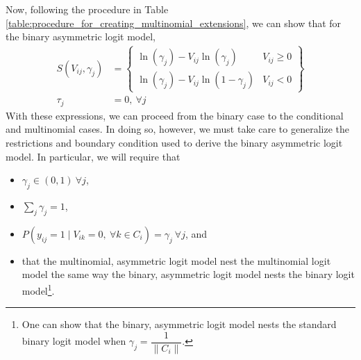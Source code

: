 Now, following the procedure in Table \ref{table:procedure_for_creating_multinomial_extensions}, we can show that for the binary asymmetric logit model,
\begin{equation*}
\begin{aligned}
S \left( V_{ij}, \gamma _j \right) &= \left\lbrace \begin{array}{cc}
 \ln \left( \gamma _j \right) - V_{ij} \ln \left( \gamma_j \right) & V_{ij} \geq 0
 \\
 \ln \left( \gamma _j \right) - V_{ij} \ln \left( 1 - \gamma_j \right) & V_{ij} < 0
\end{array} \right\rbrace \\
\tau_j &= 0, \ \forall j
\end{aligned}
\end{equation*}
With these expressions, we can proceed from the binary case to the conditional and multinomial cases. In doing so, however, we must take care to generalize the restrictions and boundary condition used to derive the binary asymmetric logit model. In particular, we will require that
\begin{itemize}
\item $\gamma_j \in \left( 0, 1 \right) \ \forall j$,
\item $ \sum _j \gamma_j = 1$,
\item $ P \left( y_{ij} = 1 \mid V_{ik} = 0, \  \forall k \in C_i \right) = \gamma _j \ \forall j $, and 
\item that the multinomial, asymmetric logit model nest the multinomial logit model the same way the binary, asymmetric logit model nests the binary logit model\footnote{One can show that the binary, asymmetric logit model nests the standard binary logit model when $\gamma _j = \dfrac{1}{\parallel C_i \parallel}$.}.
\end{itemize} 


